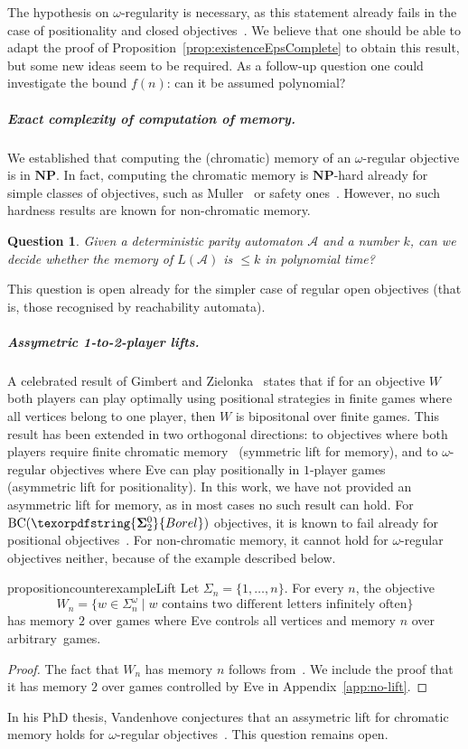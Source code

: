 \documentclass[a4paper,UKenglish,cleveref, thm-restate]{lipics-v2021}
\newtheorem{question}{Question}
\newcommand{\boldclass}[3]{\texorpdfstring{\ensuremath{\mathbf{#1}^{#2}_{#3}}}{Borel}}
\newcommand{\BCSigma}{\mathrm{BC}(\boldclass{\Sigma}{0}{2})}
\newcommand{\A}{\mathcal{A}}
\newcommand{\NP}{\textbf{NP}}
\newcommand{\oo}{\omega}
\renewcommand{\SS}{\Sigma}
\begin{document}
The hypothesis on $\oo$-regularity is necessary, as this statement already fails in the case of positionality and closed objectives~\cite{CFH14}.
We believe that one should be able to adapt the proof of Proposition~\ref{prop:existenceEpsComplete} to obtain this result, but some new ideas seem to be required.
As a follow-up question one could investigate the bound $f(n)$: can it be assumed polynomial?


\subparagraph*{Exact complexity of computation of memory.} We established that computing the (chromatic) memory of an $\omega$-regular objective is in $\NP$.
In fact, computing the chromatic memory is $\NP$-hard already for simple classes of objectives, such as Muller~\cite{Casares22Chromatic} or safety ones~\cite{BFRV23Regular}.
However, no such hardness results are known for non-chromatic memory.

\begin{question}\label{quest:ptime}
	Given a deterministic parity automaton $\A$ and a number $k$, can we decide whether the memory of $L(\A)$ is $\leq k$ in polynomial time?
\end{question}

This question is open already for the simpler case of regular open objectives (that is, those recognised by reachability automata).


\subparagraph{Assymetric 1-to-2-player lifts.} A celebrated result of Gimbert and Zielonka~\cite{GZ05} states that if for an objective $W$ both players can play optimally using positional strategies in finite games where all vertices belong to one player, then $W$ is bipositonal over finite games. This result has been extended in two orthogonal directions: to objectives where both players require finite chromatic memory~\cite{BRORV22,BRV23} (symmetric lift for memory), and to $\oo$-regular objectives where Eve can play positionally in $1$-player games~\cite{CO24Positional} (asymmetric lift for positionality).
In this work, we have not provided an asymmetric lift for memory, as in most cases no such result can hold.
For  $\BCSigma$ objectives, it is known to fail already for positional objectives~\cite[Section~7]{GK22Submixing}.
For non-chromatic memory, it cannot hold for $\oo$-regular objectives neither, because of the example described below.

\begin{restatable}{proposition}{counterexampleLift}
\label{prop:1-2-player-counterexample}
	Let $\Sigma_n = \{1,\dots, n\}$. For every $n$, the objective 
	\[W_n = \{w\in \SS_n^\oo \mid w \text{ contains two different letters infinitely often}\} \] 
	 has memory $2$ over games where Eve controls all vertices and memory $n$ over arbitrary~games.
\end{restatable}
\begin{proof}
	The fact that $W_n$ has memory $n$ follows from~\cite{DJW1997memory}. We include the proof that it has memory $2$ over games controlled by Eve in Appendix~\ref{app:no-lift}.
\end{proof}
In his PhD thesis, Vandenhove conjectures that an assymetric lift for chromatic memory holds for $\oo$-regular objectives~\cite[Conjecture~9.1.2]{Vandenhove23Thesis}. This question remains open.
\end{document}
